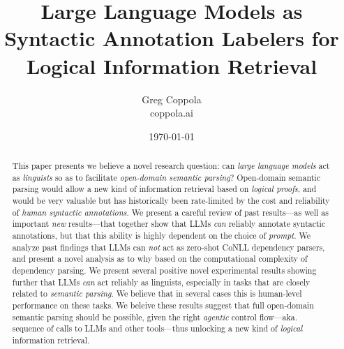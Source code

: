 \documentclass[11pt]{article}
\title{Large Language Models as Syntactic Annotation Labelers for Logical Information Retrieval}
\author{Greg Coppola\\coppola.ai}
\date{\today}
\begin{document}
\maketitle

\begin{abstract}
This paper presents we believe a novel research question: can \emph{large language models} act as \emph{linguists} so as to facilitate \emph{open-domain semantic parsing}?
Open-domain semantic parsing would allow a new kind of information retrieval based on \emph{logical proofs}, and would be very valuable but has historically been rate-limited by the cost and reliability of \emph{human syntactic annotations}.
We present a careful review of past results---as well as important {\em new} results---that together show that LLMs \emph{can} reliably annotate syntactic annotations, but that this ability is highly dependent on the choice of \emph{prompt}.
We analyze past findings that LLMs can \emph{not} act as zero-shot CoNLL dependency parsers, and present a novel analysis as to why based on the computational complexity of dependency parsing.
We present several positive novel experimental results showing further that LLMs \emph{can} act reliably as linguists, especially in tasks that are closely related to \emph{semantic parsing}.
We believe that in several cases this is human-level performance on these tasks.
We beleive these results suggest that full open-domain semantic parsing should be possible, given the right \emph{agentic} control flow---aka. sequence of calls to LLMs and other tools---thus unlocking a new kind of \emph{logical} information retrieval.
\end{abstract}
\end{document}
